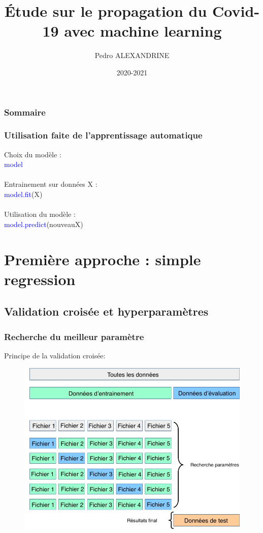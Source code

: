 \documentclass{beamer}
\title{Étude sur le propagation du Covid-19 avec machine learning}
\date{2020-2021}
\institute{numero d'inscription : 41758}
\author{Pedro ALEXANDRINE}
\begin{document}
\begin{frame}
	\maketitle
\end{frame}

\begin{frame}
	\frametitle{Sommaire}
	\tableofcontents
\end{frame}

\begin{frame}
	\frametitle{Utilisation faite de l'apprentissage automatique}
Choix du modèle :\\ \textcolor{blue}{model\\}
\textcolor{white}{Celui là en blanc\\}
\pause
Entrainement sur données X : \\ \textcolor{blue}{model.fit}(X)\\
\textcolor{white}{Celui là en blanc\\}
\pause
Utilisation du modèle : \\ \textcolor{blue}{model.predict}(nouveauX)
\end{frame}


\section{Première approche : simple regression}
\subsection{Validation croisée et hyperparamètres}
\begin{frame}
	\frametitle{Recherche du meilleur paramètre}
	Principe de la  validation croisée:
	\begin{figure}[b]
		\centering
		\includegraphics[scale=0.27]{gscv}
	\end{figure}
\end{frame}
\end{document}
